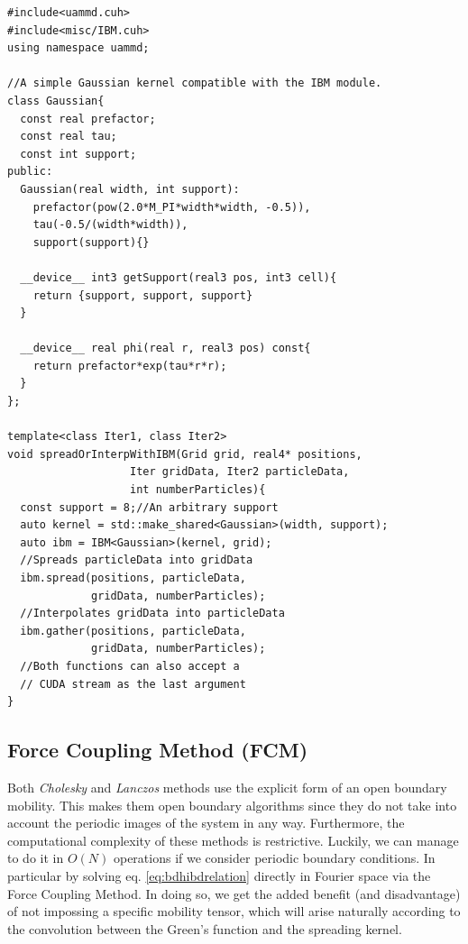 \documentclass[ twoside,openright,titlepage,numbers=noenddot,%
headinclude,footinclude,cleardoublepage=empty,abstract=on,
BCOR=5mm,paper=a4,fontsize=11pt, dvipsnames
]{scrreprt}
\def\ucpp{uammd_cpp_lexer.py:UAMMDCppLexer -x}
\begin{document}
\begin{verbatim}
#include<uammd.cuh>
#include<misc/IBM.cuh>
using namespace uammd;

//A simple Gaussian kernel compatible with the IBM module.
class Gaussian{
  const real prefactor;
  const real tau;
  const int support;
public:
  Gaussian(real width, int support):
    prefactor(pow(2.0*M_PI*width*width, -0.5)),
    tau(-0.5/(width*width)),
    support(support){}

  __device__ int3 getSupport(real3 pos, int3 cell){
    return {support, support, support}
  }

  __device__ real phi(real r, real3 pos) const{
    return prefactor*exp(tau*r*r);
  }
};

template<class Iter1, class Iter2>
void spreadOrInterpWithIBM(Grid grid, real4* positions,
                   Iter gridData, Iter2 particleData,
                   int numberParticles){
  const support = 8;//An arbitrary support
  auto kernel = std::make_shared<Gaussian>(width, support);
  auto ibm = IBM<Gaussian>(kernel, grid);
  //Spreads particleData into gridData
  ibm.spread(positions, particleData, 
             gridData, numberParticles);
  //Interpolates gridData into particleData
  ibm.gather(positions, particleData,
             gridData, numberParticles);
  //Both functions can also accept a 
  // CUDA stream as the last argument
}
\end{verbatim}






\subsection{Force Coupling Method (FCM)}\label{sec:fcm}
Both \emph{Cholesky} and \emph{Lanczos} methods use the explicit form of an open boundary mobility. This makes them open boundary algorithms since they do not take into account the periodic images of the system in any way. Furthermore, the computational complexity of these methods is restrictive. Luckily, we can manage to do it in $O(N)$ operations if we consider periodic boundary conditions. In particular by solving eq. \eqref{eq:bdhibdrelation} directly in Fourier space via the Force Coupling Method\cite{Keaveny2014}. In doing so, we get the added benefit (and disadvantage) of not impossing a specific mobility tensor, which will arise naturally according to the convolution between the Green's function and the spreading kernel.
\end{document}
